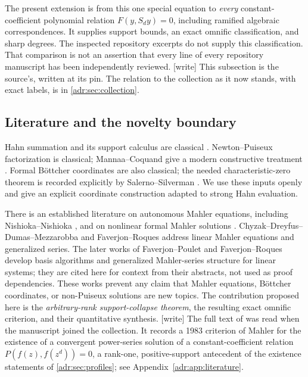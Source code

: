 \documentclass[11pt,letterpaper]{article}
\numberwithin{equation}{section}
\theoremstyle{definition}
\theoremstyle{remark}
\newcommand{\wtag}{\textup{[write]}}%
\begin{document}
The present extension is from this one special equation to
\emph{every} constant-coefficient polynomial relation $F(y,S_dy)=0$,
including ramified algebraic correspondences. It supplies support bounds,
an exact omnific classification, and sharp degrees. The inspected
repository excerpts do not supply this classification. That comparison
is not an assertion that every line of every repository manuscript has
been independently reviewed.
\wtag{} This subsection is the source's, written at its pin. The relation
to the collection as it now stands, with exact labels, is in
\cref{adr:sec:collection}.

\subsection{Literature and the novelty boundary}

Hahn summation and its support calculus are classical \cite{Neumann}.
Newton--Puiseux factorization is classical; Mannaa--Coquand give a modern
constructive treatment \cite{MC}. Formal B\"ottcher coordinates are also
classical; the needed characteristic-zero theorem is recorded explicitly
by Salerno--Silverman \cite{SS}. We use these inputs openly and give an
explicit coordinate construction adapted to strong Hahn evaluation.

There is an established literature on autonomous Mahler equations,
including Nishioka--Nishioka \cite{NN}, and on nonlinear formal Mahler
solutions \cite{GG}. Chyzak--Dreyfus--Dumas--Mezzarobba \cite{CDDM} and
Faverjon--Roques \cite{FR} address linear Mahler equations and generalized
series. The later works of Faverjon--Poulet \cite{FP} and
Faverjon--Roques \cite{FRPurity} develop basis algorithms and generalized
Mahler-series structure for linear systems; they are cited here for
context from their abstracts, not used as proof dependencies.
These works prevent any claim that Mahler equations, B\"ottcher
coordinates, or non-Puiseux solutions are new topics. The contribution
proposed here is the \emph{arbitrary-rank support-collapse theorem}, the
resulting exact omnific criterion, and their quantitative synthesis.
\wtag{} The full text of \cite{NN} was read when the manuscript joined the
collection. It records a 1983 criterion of Mahler \cite{Mahler83} for the
existence of a convergent power-series solution of a constant-coefficient
relation $P(f(z),f(z^d))=0$, a rank-one, positive-support antecedent of the
existence statements of \cref{adr:sec:profiles}; see
Appendix~\ref{adr:app:literature}.
\end{document}
